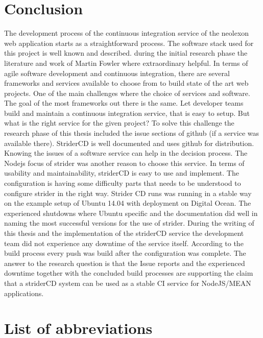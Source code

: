 \section{Conclusion}
\label{section:Conclusion}
The development process of the continuous integration service of the neolexon web application starts as a straightforward process. The software stack
used for this project is well known and described. during the initial research phase the literature and work of Martin Fowler where extraordinary
helpful. In terms of agile software development and continuous integration, there are several frameworks and services available to choose from to build
state of the art web projects. One of the main challenges where the choice of services and software. The goal of the most frameworks out there is
the same. Let developer teams build and maintain a continuous integration service, that is easy to setup. But what is the right service for the given project?
To solve this challenge the research phase of this thesis included the issue sections of github (if a service was available there). StriderCD is well
documented and uses github for distribution. Knowing the issues of a software service can help in the decision process. The Nodejs focus of strider
was another reason to choose this service. In terms of usability and maintainability, striderCD is easy to use and implement. The configuration is having
some difficulty parts that needs to be understood to configure strider in the right way. Strider CD runs was running in a stable way on the example setup
of Ubuntu 14.04 with deployment on Digital Ocean. The experienced shutdowns where Ubuntu specific and the documentation did well in naming the most
successful versions for the use of strider. During the writing of this thesis and the implementation of the striderCD service the development team did
not experience any downtime of the service itself. According to the build process every push was build after the configuration was complete. The answer
to the research question is that the Issue reports and the experienced downtime together with the concluded build processes are supporting the claim that
a striderCD system can be used as a stable CI service for NodeJS/MEAN applications.

\newpage
\section{List of abbreviations}
\label{section:List of abbreviations}

